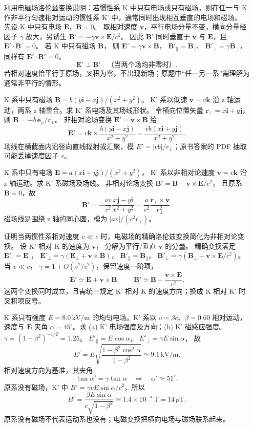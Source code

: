 利用电磁场洛伦兹变换说明：若惯性系 K 中只有电场或只有磁场，则在任一与 K 作非平行匀速相对运动的惯性系 K' 中，通常同时出现相互垂直的电场和磁场。
\exsolution
先设 K 中只有电场 $\bm E$，$\bm B=0$。
取相对速度 $\bm v$，平行电场分量不变，横向分量经因子 $\gamma$ 放大，另诱生
$\bm B'=-\gamma\bm v\times\bm E/c^2$。
因此 $\bm B'$ 同时垂直于 $\bm v$ 与 $\bm E$，且
$\bm E'\cdot\bm B'=0$。
若 K 中只有磁场 $\bm B$，
则
$\bm E'=\gamma\bm v\times\bm B$，
$\bm B'_{\parallel}=\bm B_{\parallel}$、
$\bm B'_\perp=\gamma\bm B_\perp$，
同样有
$\bm E'\cdot\bm B'=0$。
\[
\boxed{\bm E'\perp\bm B'\quad
\text{（当两个场均非零时）}}.
\]
\excheck 若相对速度恰平行于原场，叉积为零，不出现新场；原题中“任一另一系”需理解为通常非平行的情形。

K 系中只有磁场
$\bm B=b(y\bm i-x\bm j)/(x^2+y^2)$。
K' 系以低速 $\bm v=v\bm k$ 沿 z 轴运动，两系 z 轴重合。求 K' 系电场及其场线形状。
\exsolution
令横向位置矢量
$\bm r_\perp=x\bm i+y\bm j$，则
$\bm B=-b\,\bm e_\varphi/r_\perp$。
非相对论场变换
$\bm E'=\bm v\times\bm B$ 给
\[
\bm E'=v\bm k\times
\frac{b(y\bm i-x\bm j)}{x^2+y^2}
=\boxed{\frac{vb(x\bm i+y\bm j)}{x^2+y^2}}.
\]
\excheck 场线在横截面内沿径向直线辐射或汇聚，模 $E'=|vb|/r_\perp$；原书答案的 PDF 抽取可能丢掉速度因子 $v$。

K 系中只有电场
$\bm E=a(x\bm i+y\bm j)/(x^2+y^2)$，
K' 系以非相对论速度 $\bm v=v\bm k$ 沿 z 轴运动。求 K' 系磁场及场线。
\exsolution
非相对论场变换
$\bm B'=\bm B-\bm v\times\bm E/c^2$，
且原系 $\bm B=0$，故
\[
\boxed{\bm B'=
-\frac{av}{c^2}\frac{x\bm j-y\bm i}{x^2+y^2}
=\frac{a}{c^2}\frac{\bm r_\perp\times\bm v}{r_\perp^2}}.
\]
\excheck 磁场线是围绕 z 轴的同心圆，模为 $|av|/(c^2r_\perp)$。

证明当两惯性系相对速度 $v\ll c$ 时，电磁场的精确洛伦兹变换简化为非相对论变换。
\exsolution
设 K' 相对 K 的速度为 $\bm v$，
分解为平行/垂直 $\bm v$ 的分量。
精确变换满足
$\bm E'_{\parallel}=\bm E_\parallel$，
$\bm E'_\perp=\gamma(\bm E_\perp+\bm v\times\bm B)$，
$\bm B'_\parallel=\bm B_\parallel$，
$\bm B'_\perp=\gamma(\bm B_\perp-\bm v\times\bm E/c^2)$。
当 $v\ll c$，
$\gamma=1+O(v^2/c^2)$，保留速度一阶项，
\[
\boxed{\bm E'\simeq\bm E+\bm v\times\bm B},
\qquad
\boxed{\bm B'\simeq\bm B-\frac{\bm v\times\bm E}{c^2}}.
\]
\excheck 这两个变换同时成立，且需统一规定 K' 相对 K 的速度方向；换成 K 相对 K' 时叉积项反号。

K 系只有强度 $E=8.0\,\mathrm{kV/m}$ 的均匀电场。K' 系以 $v=\beta c$、$\beta=0.60$ 相对运动，速度与 $\bm E$ 夹角 $\alpha=45^\circ$。求 (a) K' 电场强度及方向；(b) K' 磁感应强度。
\exsolution
$\gamma=(1-\beta^2)^{-1/2}=1.25$。
$E'_\parallel=E\cos\alpha$，
$E'_\perp=\gamma E\sin\alpha$，
故
\[
\boxed{E'=E
\sqrt{\frac{1-\beta^2\cos^2\alpha}{1-\beta^2}}
\simeq9.1\,\mathrm{kV/m}}.
\]
相对速度方向为基准，其夹角
\[
\boxed{\tan\alpha'=\gamma\tan\alpha
\quad\Rightarrow\quad
\alpha'\simeq51^\circ}.
\]
原系没有磁场，K' 中
$B'=\gamma vE\sin\alpha/c^2$，所以
\[
\boxed{B'=\frac{\beta E\sin\alpha}
{c\sqrt{1-\beta^2}}
\simeq1.4\times10^{-5}\,\mathrm T=14\,\mathrm{\mu T}}.
\]
\excheck 原系没有磁场不代表运动系也没有；电磁变换把横向电场与磁场联系起来。

